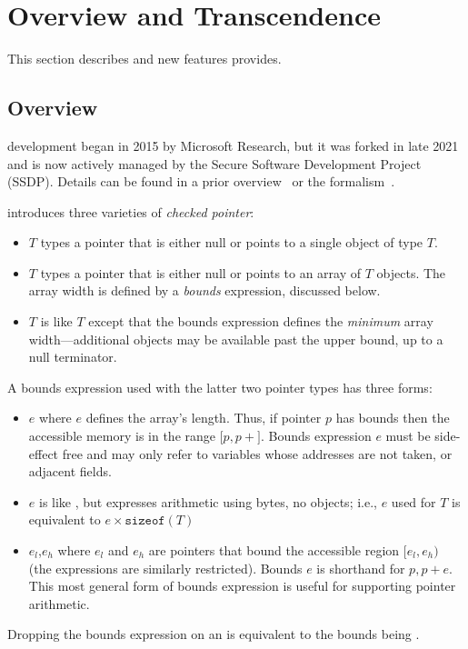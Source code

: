 \section{Overview and Transcendence}\label{sec:overview}
This section describes \checkedc{} and new features \systemname{} provides.

\subsection{\checkedc Overview}
% 
\checkedc{} development began in 2015 by Microsoft Research, but it was forked
in late 2021 and is now actively managed by the Secure Software
Development Project (SSDP). Details can be found in a prior
overview~\cite{Elliott2018} or the formalism~\cite{li22checkedc}.
%

\checkedc{} introduces three varieties of \emph{checked pointer}:
\begin{itemize}
\item {}$T$\code{>} types a pointer that is either null or
  points to a single object of type $T$.
\item {}$T$\code{>} types a pointer that is either null
  or points to an array of $T$ objects. The array width is defined
  by a \emph{bounds} expression, discussed below.
\item {}$T$\code{>} is like
  $T$\code{>} except that the bounds expression
  defines the \emph{minimum} array width---additional objects may
  be available past the upper bound, up to a null terminator.
\end{itemize}
A bounds expression used with the latter two pointer types has three
forms:
\begin{itemize}
\item {}$e$\code{)} where $e$ defines the array's
  length. Thus, if pointer $p$ has bounds  then the
  accessible memory is in the range $[p,p+$$]$. Bounds
  expression $e$ must be side-effect free and may only refer to
  variables whose addresses are not taken, or adjacent 
  fields.
\item {}$e$\code{)} is like , but
  expresses arithmetic using bytes, no objects; i.e.,
  $e$\code{)} used for $T$\code{>} is
  equivalent to $e\times\texttt{sizeof}(T)$\code{)}
\item {}$e_l$,$e_h$\code{)} where $e_l$ and $e_h$ are
  pointers that bound the accessible region $[e_l,e_h)$ (the
  expressions are similarly restricted). Bounds
  $e$\code{)} is shorthand for
  $p, p + e$\code{)}. This most general form of bounds
  expression is useful for supporting pointer arithmetic.
\end{itemize}
  Dropping the bounds expression on an  is equivalent
  to the bounds being .

